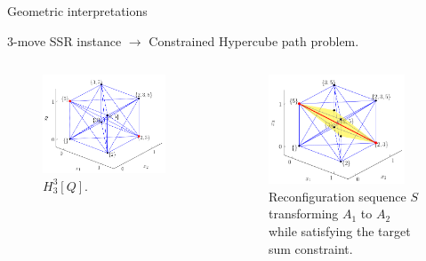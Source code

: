 \begin{frame}{Geometric interpretations}
  \begin{block}{$3$-move SSR instance $\rightarrow$ Constrained Hypercube path problem.}
            \begin{columns}
                \begin{column}{0.5\textwidth}
                    \begin{figure}
                    \centering
                    \includegraphics[width=0.9\textwidth]{img/3SSR_1.png}
                    \caption{$H_3^{3}[Q]$.}
                    \label{fig:ps}
                    \end{figure}
                \end{column}
                \begin{column}{0.5\textwidth}
                    \begin{figure}
                    \centering
                    \includegraphics[width=0.9\textwidth]{img/3SSR_2.png}
                    \caption{Reconfiguration sequence $S$ transforming $A_1$ to $A_2$ while satisfying the target sum constraint.\hfill \break}
                    \label{fig:circle}
                    \end{figure}
                \end{column}
            \end{columns}
  \end{block}
\end{frame}

